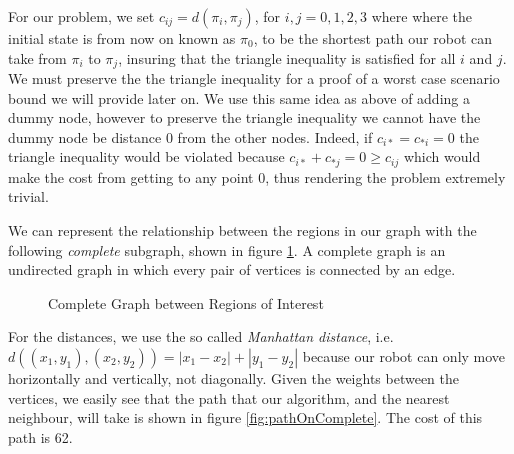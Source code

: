 For our problem, we set $c_{ij}=d(\pi_i , \pi_j)$, for $i,j=0,1,2,3$ where where the initial state is from now on known as $\pi_0$, to be the shortest path our robot can take from $\pi_i$ to $\pi_j$, insuring that the triangle inequality is satisfied for all $i$ and $j$. We must preserve the the triangle inequality for a proof of a worst case scenario bound we will provide later on. We use this same idea as above of adding a dummy node, however to preserve the triangle inequality we cannot have the dummy node be distance 0 from the other nodes. Indeed, if $c_{i*} = c_{*i} = 0 $ the triangle inequality would be violated because $c_{i*} + c_{*j} = 0 \geq c_{ij}$ which would make the cost from getting to any point 0, thus rendering the problem extremely trivial. 

We can represent the relationship between the regions in our graph with the following \textit{complete} subgraph, shown in figure \ref{fig:completeGraph}. A complete graph is an undirected graph in which every pair of vertices is connected by an edge. 
\begin{figure}
\centering
{}
\caption{Complete Graph between Regions of Interest}
\label{fig:completeGraph}
\end{figure}

For the distances, we use the so called \textit{Manhattan distance}, i.e.\ $d((x_1,y_1),(x_2,y_2)) = |x_1 - x_2| +| y_1 - y_2|$ because our robot can only move horizontally and vertically, not diagonally. Given the weights between the vertices, we easily see that the path that our algorithm, and the nearest neighbour, will take is shown in figure \ref{fig:pathOnComplete}. The cost of this path is 62.

